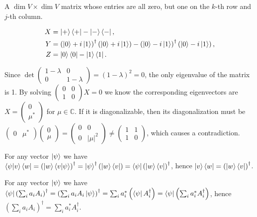 \ex A $\operatorname{dim}V\times\operatorname{dim}V$ matrix whose entries are all zero, but one on the $k$-th row and $j$-th column.

\ex $$\begin{aligned}
    X & = \left|+\right\rangle\left\langle+\right|-\left|-\right\rangle\left\langle-\right|,\\
    Y & = \left(\left|0\right\rangle+i\left|1\right\rangle\right)^\dagger\left(\left|0\right\rangle+i\left|1\right\rangle\right)-\left(\left|0\right\rangle-i\left|1\right\rangle\right)^\dagger\left(\left|0\right\rangle-i\left|1\right\rangle\right),\\
    Z & = \left|0\right\rangle\left\langle0\right|-\left|1\right\rangle\left\langle1\right|.
\end{aligned}$$

\ex Since $\det\begin{pmatrix}1-\lambda&0\\0&1-\lambda\end{pmatrix}=(1-\lambda)^2=0$, the only eigenvalue of the matrix is 1.
By solving $\begin{pmatrix}0&0\\1&0\end{pmatrix}X=0$ we know the corresponding eigenvectors are $X=\begin{pmatrix}0\\\mu^*\end{pmatrix}$ for $\mu\in\mathbb{C}$.
If it is diagonalizable, then its diagonalization must be $\begin{pmatrix}0&\mu^*\end{pmatrix}\begin{pmatrix}0\\\mu\end{pmatrix}=\begin{pmatrix}0&0\\0&|\mu|^2\end{pmatrix}\neq\begin{pmatrix}1&1\\1&0\end{pmatrix}$, which causes a contradiction.

\ex For any vector $\left|\psi\right\rangle$ we have $\left\langle\psi\middle|v\right\rangle\left\langle w\right|=\left(\left|w\right\rangle\left\langle v\middle|\psi\right\rangle\right)^\dagger=\left|\psi\right\rangle^\dagger\left(\left|w\right\rangle\left\langle v\right|\right)=\left\langle\psi\right|\left(\left|w\right\rangle\left\langle v\right|\right)^\dagger$, hence $\left|v\right\rangle\left\langle w\right|=\left(\left|w\right\rangle\left\langle v\right|\right)^\dagger$.

\ex For any vector $\left|\psi\right\rangle$ we have $\left\langle\psi\right|\left(\sum_ia_iA_i\right)^\dagger=\left(\sum_ia_iA_i\left|\psi\right\rangle\right)^\dagger=\sum_ia_i^*\left(\left\langle\psi\right|A_i^\dagger\right)=\left\langle\psi\right|\left(\sum_ia_i^*A_i^\dagger\right)$, hence $\left(\sum_ia_iA_i\right)^\dagger=\sum_ia_i^*A_i^\dagger$.

